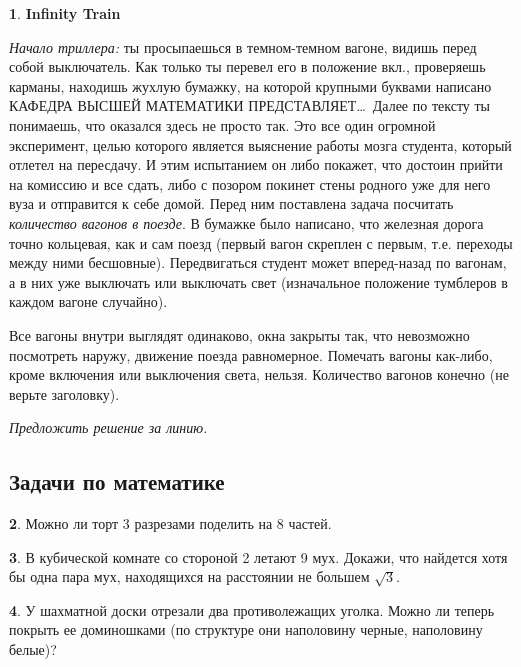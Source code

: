 \documentclass[14pt, a4paper]{extarticle}
\theoremstyle{definition}
\newtheorem{problem}{}
\theoremstyle{definition}
\theoremstyle{remark}
\numberwithin{equation}{section}
\begin{document}
\begin{problem}
    \textbf{Infinity Train}

    \textit{Начало триллера:} ты просыпаешься в темном-темном вагоне,
    видишь перед собой выключатель. Как только ты перевел его в положение
    вкл., проверяешь карманы, находишь жухлую бумажку, на которой 
    крупными буквами написано КАФЕДРА ВЫСШЕЙ МАТЕМАТИКИ ПРЕДСТАВЛЯЕТ\dots\
    Далее по тексту ты понимаешь, что оказался здесь не просто так.
    Это все один огромной эксперимент, целью которого является выяснение
    работы мозга студента, который отлетел на пересдачу. И этим испытанием
    он либо покажет, что достоин прийти на комиссию и все сдать, либо с 
    позором покинет стены родного уже для него вуза и отправится к себе домой.
    Перед ним поставлена задача посчитать \textit{количество вагонов 
    в поезде}. В бумажке было написано, что железная дорога точно кольцевая,
    как и сам поезд (первый вагон скреплен с первым, т.е. переходы между
    ними бесшовные). Передвигаться студент может вперед-назад по вагонам,
    а в них уже выключать или выключать свет (изначальное положение тумблеров
    в каждом вагоне случайно).

    Все вагоны внутри выглядят одинаково, окна закрыты так, что невозможно 
    посмотреть наружу, движение поезда равномерное. Помечать вагоны как-либо, 
    кроме включения или выключения света, нельзя. 
    Количество вагонов конечно (не верьте заголовку).

    \textit{Предложить решение за линию.}
\end{problem}

\subsection*{Задачи по математике}
\setcounter{problem}{0}

\begin{problem}
    Можно ли торт 3 разрезами поделить на 8 частей.
\end{problem}

\begin{problem}
    В кубической комнате со стороной 2 летают 9 мух. 
    Докажи, что найдется хотя бы одна пара мух, 
    находящихся на расстоянии не большем $\sqrt{3}$.
\end{problem}

\begin{problem}
    У шахматной доски отрезали два противолежащих уголка.
    Можно ли теперь покрыть ее доминошками (по структуре они
    наполовину черные, наполовину белые)?
\end{problem}
\end{document}
